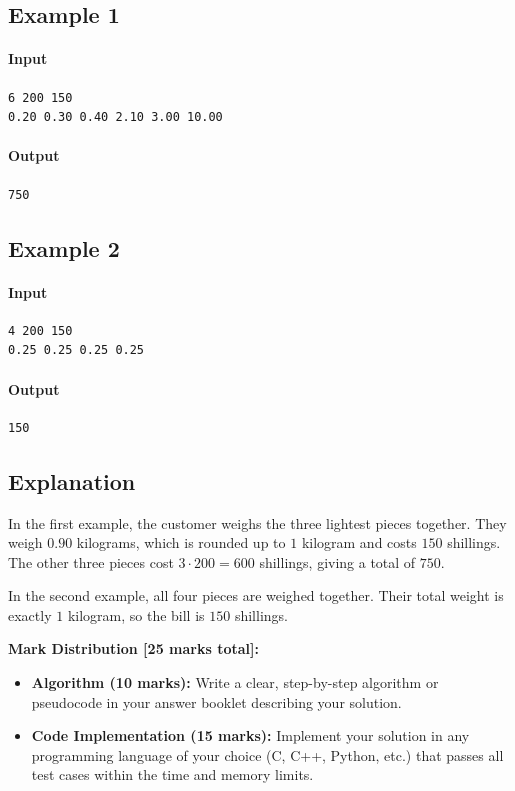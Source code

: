 \documentclass[a4paper,12pt]{article}
\begin{document}
\subsection*{Example 1}

\paragraph{Input}
\begin{verbatim}
6 200 150
0.20 0.30 0.40 2.10 3.00 10.00
\end{verbatim}

\paragraph{Output}
\begin{verbatim}
750
\end{verbatim}

\subsection*{Example 2}

\paragraph{Input}
\begin{verbatim}
4 200 150
0.25 0.25 0.25 0.25
\end{verbatim}

\paragraph{Output}
\begin{verbatim}
150
\end{verbatim}

\subsection*{Explanation}

In the first example, the customer weighs the three lightest pieces
together. They weigh \(0.90\) kilograms, which is rounded up to \(1\)
kilogram and costs \(150\) shillings. The other three pieces cost
\(3\cdot200=600\) shillings, giving a total of \(750\).

In the second example, all four pieces are weighed together. Their total
weight is exactly \(1\) kilogram, so the bill is \(150\) shillings.

\medskip
\noindent\textbf{Mark Distribution [25 marks total]:}
\begin{itemize}
    \item \textbf{Algorithm (10 marks):} Write a clear, step-by-step algorithm or pseudocode in your answer booklet describing your solution.
    \item \textbf{Code Implementation (15 marks):} Implement your solution in any programming language of your choice (C, C++, Python, etc.) that passes all test cases within the time and memory limits.
\end{itemize}

\ifdefined\KIOInclude\else
\end{document}
